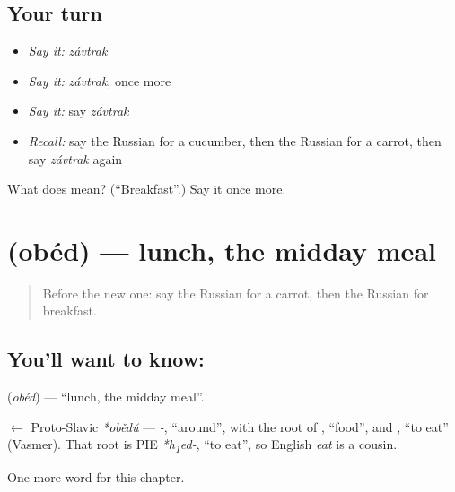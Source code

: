 \subsection*{Your turn}
\begin{itemize}
\raggedright
  \item \emph{Say it:} \emph{závtrak}
  \item \emph{Say it:} \emph{závtrak}, once more
  \item \emph{Say it:} say \emph{závtrak}
  \item \emph{Recall:} say the Russian for a cucumber, then the Russian for a carrot, then say \emph{závtrak} again
\end{itemize}

\begin{tcolorbox}[breakable,colback=teal!4,colframe=teal!35!black,title={Before you move on}]
What does  mean? (\textquotedblleft{}Breakfast\textquotedblright{}.) Say it once more.
\end{tcolorbox}
\section[\texorpdfstring{\ru{обед} (obéd)}{обед (obéd)}]{ (obéd) — lunch, the midday meal}

\label{lesson:RU-C46-lunch}



\begin{quote}
Before the new one: say the Russian for a carrot, then the Russian for breakfast.
\end{quote}

\subsection*{You'll want to know: }
\textbf{} (\emph{obéd}) — \textquotedblleft{}lunch, the midday meal\textquotedblright{}.

\begin{cousinweb}
\textbf{} $\leftarrow$ Proto-Slavic \emph{*obědŭ} — \emph{-}, \textquotedblleft{}around\textquotedblright{}, with the root of \emph{}, \textquotedblleft{}food\textquotedblright{}, and \emph{}, \textquotedblleft{}to eat\textquotedblright{} (Vasmer). That root is PIE \emph{*h\textsubscript{1}ed-}, \textquotedblleft{}to eat\textquotedblright{}, so English \emph{eat} is a cousin.
\end{cousinweb}

\begin{grammarlens}[title={What you've built}]
One more word for this chapter.
\end{grammarlens}

